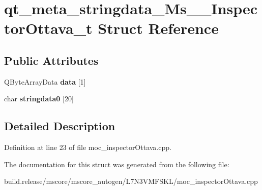 \hypertarget{structqt__meta__stringdata___ms_____inspector_ottava__t}{}\section{qt\+\_\+meta\+\_\+stringdata\+\_\+\+Ms\+\_\+\+\_\+\+Inspector\+Ottava\+\_\+t Struct Reference}
\label{structqt__meta__stringdata___ms_____inspector_ottava__t}
\subsection*{Public Attributes}
\begin{DoxyCompactItemize}
\item 
\mbox{\label{structqt__meta__stringdata___ms_____inspector_ottava__t_a7e601a0f72c0a921309b341f6d7ad807}} 
Q\+Byte\+Array\+Data {\bfseries data} \mbox{[}1\mbox{]}
\item 
\mbox{\label{structqt__meta__stringdata___ms_____inspector_ottava__t_a8bfbc1d03556d16ac41dbf5bdb28432d}} 
char {\bfseries stringdata0} \mbox{[}20\mbox{]}
\end{DoxyCompactItemize}


\subsection{Detailed Description}


Definition at line 23 of file moc\+\_\+inspector\+Ottava.\+cpp.



The documentation for this struct was generated from the following file\+:\begin{DoxyCompactItemize}
\item 
build.\+release/mscore/mscore\+\_\+autogen/\+L7\+N3\+V\+M\+F\+S\+K\+L/moc\+\_\+inspector\+Ottava.\+cpp\end{DoxyCompactItemize}
